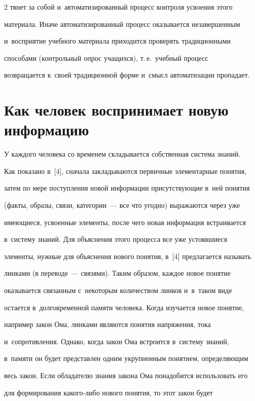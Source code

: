 \begin{multicols}{2}
тянет за собой и~автоматизированный процесс контроля усвоения этого 


материала. Иначе автоматизированный процесс оказывается незавершенным 


и~восприятие учебного материала приходится проверять традиционными 


способами (контрольный опрос учащихся), т.\,е.\ учебный процесс 


возвращается к~своей традиционной форме и~смысл автоматизации пропадает.


  


\section{Как человек воспринимает новую информацию}





  У каждого человека со временем складывается собственная система знаний. 


Как показано в~[4], сначала закладываются первичные элементарные понятия, 


затем по мере поступления новой информации присутствующие в~ней понятия 


(факты, образы, связи, категории~--- все что угодно) выражаются через уже 


имеющиеся, усвоенные элементы, после чего новая информация встраивается 


в~сис\-те\-му знаний. Для объяснения этого процесса все уже устоявшиеся 


элементы, нужные для объяснения нового понятия, в~[4] предлагается называть 


линками (в переводе~--- связями). Таким образом, каждое новое понятие 


оказывается связанным с~некоторым количеством линков и~в~таком виде 


остается в~долговременной памяти человека. Когда изучается новое понятие, 


например закон Ома, линками являются понятия напряжения, тока 


и~сопротивления. Однако, когда закон Ома встроится в~сис\-те\-му знаний, 


в~памяти он будет представлен одним укрупненным понятием, определяющим 


весь закон. Если обладателю знания закона Ома понадобится использовать его 


для формирования ка\-ко\-го-ли\-бо нового понятия, то этот закон будет 



\end{multicols}
